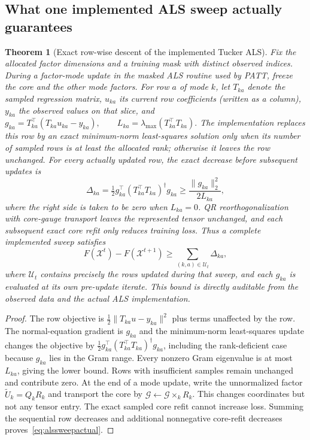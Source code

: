 \documentclass[review,10pt]{elsarticle}
\newtheorem{theorem}{Theorem}
\newcommand{\cX}{\mathcal X}
\newcommand{\cG}{\mathcal G}
\begin{document}
\subsection{What one implemented ALS sweep actually guarantees}\label{subsec:alsactual}
\begin{theorem}[Exact row-wise descent of the implemented Tucker ALS]\label{thm:alsactual}
Fix the allocated factor dimensions and a training mask with distinct observed indices. During a factor-mode update in the masked ALS routine used by PATT, freeze the core and the other mode factors. For row $a$ of mode $k$, let $T_{ka}$ denote the sampled regression matrix, $u_{ka}$ its current row coefficients (written as a column), $y_{ka}$ the observed values on that slice, and
 \(g_{ka}=T_{ka}^\top(T_{ka}u_{ka}-y_{ka}),\qquad L_{ka}=\lambda_{\max}(T_{ka}^\top T_{ka}).\) 
The implementation replaces this row by an exact minimum-norm least-squares solution only when its number of sampled rows is at least the allocated rank; otherwise it leaves the row unchanged. For every actually updated row, the \emph{exact} decrease before subsequent updates is
\begin{equation}\label{eq:alsrowgain}
\Delta_{ka}=\tfrac12g_{ka}^\top(T_{ka}^\top T_{ka})^\dagger g_{ka}
\ge\frac{\|g_{ka}\|_2^2}{2L_{ka}},
\end{equation}
where the right side is taken to be zero when $L_{ka}=0$. QR reorthogonalization with core-gauge transport leaves the represented tensor unchanged, and each subsequent exact core refit only reduces training loss. Thus a complete implemented sweep satisfies
\begin{equation}\label{eq:alssweepactual}
\boxed{F(\cX^t)-F(\cX^{t+1})\ge\sum_{(k,a)\in\mathcal U_t}\Delta_{ka},}
\end{equation}
where $\mathcal U_t$ contains precisely the rows updated during that sweep, and each $g_{ka}$ is evaluated at its \emph{own} pre-update iterate. This bound is directly auditable from the observed data and the actual ALS implementation.
\end{theorem}
\begin{proof}
The row objective is $\frac12\|T_{ka}u-y_{ka}\|^2$ plus terms unaffected by the row. The normal-equation gradient is $g_{ka}$ and the minimum-norm least-squares update changes the objective by
$\frac12g_{ka}^\top(T_{ka}^\top T_{ka})^\dagger g_{ka}$, including the rank-deficient case because $g_{ka}$ lies in the Gram range. Every nonzero Gram eigenvalue is at most $L_{ka}$, giving the lower bound. Rows with insufficient samples remain unchanged and contribute zero. At the end of a mode update, write the unnormalized factor $\widetilde U_k=Q_kR_k$ and transport the core by $\cG\leftarrow\cG\times_k R_k$. This changes coordinates but not any tensor entry. The exact sampled core refit cannot increase loss. Summing the sequential row decreases and additional nonnegative core-refit decreases proves~\eqref{eq:alssweepactual}.
\end{proof}
\end{document}
